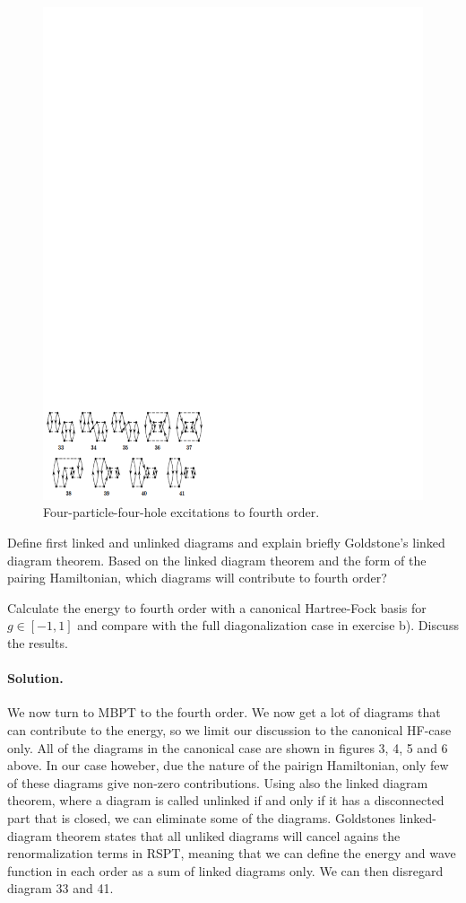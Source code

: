 \documentclass[%
twoside,                 %
final,                   %
10pt]{article}
\newenvironment{doconceexercise}{}{}
\begin{document}
\begin{doconceexercise}
\begin{figure}[t]
  \centerline{\includegraphics[width=0.6\linewidth]{fig-proj/4p4h.pdf}}
  \caption{
  Four-particle-four-hole excitations to fourth order. \label{fig:fourthorder4p4h}
  }
\end{figure}


Define first linked and unlinked diagrams and explain briefly Goldstone's linked diagram theorem.
Based on the linked diagram theorem and the form of the pairing Hamiltonian, which diagrams will contribute
to fourth order? 

Calculate the energy to fourth order with a canonical Hartree-Fock basis for $g\in [-1,1]$ and compare
with the full diagonalization case in exercise b). Discuss the results.


\paragraph{Solution.}
We now turn to MBPT to the fourth order. We now get a lot of diagrams
that can contribute to the energy, so we limit our discussion to the
canonical HF-case only. All of the diagrams in the canonical case are
shown in figures 3, 4, 5 and 6 above. In our case howeber, due the
nature of the pairign Hamiltonian, only few of these diagrams give
non-zero contributions. Using also the linked diagram theorem, where a
diagram is called unlinked if and only if it has a disconnected part
that is closed, we can eliminate some of the diagrams. Goldstones
linked-diagram theorem states that all unliked diagrams will cancel
agains the renormalization terms in RSPT, meaning that we can define
the energy and wave function in each order as a sum of linked diagrams
only. We can then disregard diagram 33 and 41.


\end{doconceexercise}
\end{document}
